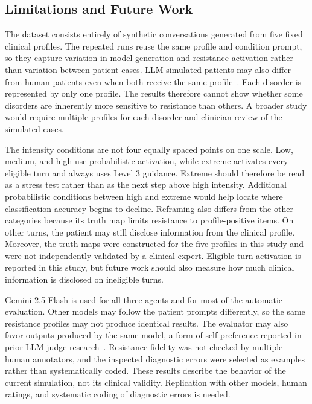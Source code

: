 \subsection{Limitations and Future Work}

The dataset consists entirely of synthetic conversations generated from five fixed clinical profiles. The repeated runs reuse the same profile and condition prompt, so they capture variation in model generation and resistance activation rather than variation between patient cases. LLM-simulated patients may also differ from human patients even when both receive the same profile~\cite{hoang2026standardised}. Each disorder is represented by only one profile. The results therefore cannot show whether some disorders are inherently more sensitive to resistance than others. A broader study would require multiple profiles for each disorder and clinician review of the simulated cases.

The intensity conditions are not four equally spaced points on one scale. Low, medium, and high use probabilistic activation, while extreme activates every eligible turn and always uses Level 3 guidance. Extreme should therefore be read as a stress test rather than as the next step above high intensity. Additional probabilistic conditions between high and extreme would help locate where classification accuracy begins to decline. Reframing also differs from the other categories because its truth map limits resistance to profile-positive items. On other turns, the patient may still disclose information from the clinical profile. Moreover, the truth maps were constructed for the five profiles in this study and were not independently validated by a clinical expert. Eligible-turn activation is reported in this study, but future work should also measure how much clinical information is disclosed on ineligible turns.

Gemini 2.5 Flash is used for all three agents and for most of the automatic evaluation. Other models may follow the patient prompts differently, so the same resistance profiles may not produce identical results. The evaluator may also favor outputs produced by the same model, a form of self-preference reported in prior LLM-judge research~\cite{chen2025selfpreference}. Resistance fidelity was not checked by multiple human annotators, and the inspected diagnostic errors were selected as examples rather than systematically coded. These results describe the behavior of the current simulation, not its clinical validity. Replication with other models, human ratings, and systematic coding of diagnostic errors is needed.

